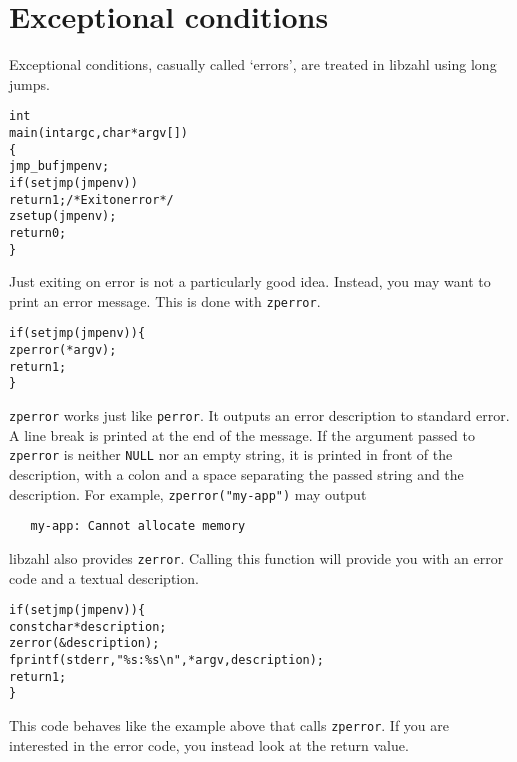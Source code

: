 \newpage
\section{Exceptional conditions}
\label{sec:Exceptional conditions}

Exceptional conditions, casually called `errors',
are treated in libzahl using long jumps.

\begin{alltt}
   int
   main(int argc, char *argv[])
   \{
       jmp_buf jmpenv;
       if (setjmp(jmpenv))
           return 1; \textcolor{c}{/* \textrm{Exit on error} */}
       zsetup(jmpenv);
       return 0;
   \}
\end{alltt}

Just exiting on error is not a particularly good
idea. Instead, you may want to print an error message.
This is done with {\tt zperror}.

\begin{alltt}
   if (setjmp(jmpenv)) \{
       zperror(\textcolor{c}{*argv});
       \textcolor{c}{return 1;}
   \}
\end{alltt}

\noindent
{\tt zperror} works just like {\tt perror}. It
outputs an error description to standard error.
A line break is printed at the end of the message.
If the argument passed to {\tt zperror} is neither
{\tt NULL} nor an empty string, it is printed in
front of the description, with a colon and a
space separating the passed string and the description.
For example, {\tt zperror("my-app")} may output

\begin{verbatim}
   my-app: Cannot allocate memory
\end{verbatim}

libzahl also provides {\tt zerror}. Calling this
function will provide you with an error code and
a textual description.

\begin{alltt}
   \textcolor{c}{if (setjmp(jmpenv)) \{}
       const char *description;
       zerror(&description);
       fprintf(stderr, "\%s: \%s\verb|\|n", *argv, description);
       \textcolor{c}{return 1;}
   \textcolor{c}{\}}
\end{alltt}

\noindent
This code behaves like the example above that
calls {\tt zperror}. If you are interested in the
error code, you instead look at the return value.

